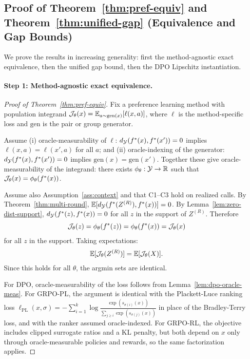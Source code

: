 \subsection{Proof of Theorem~\ref{thm:pref-equiv} and Theorem~\ref{thm:unified-gap} (Equivalence and Gap Bounds)}\label{app:proof-equivalence}

We prove the results in increasing generality: first the method-agnostic exact equivalence, then the unified gap bound, then the DPO Lipschitz instantiation.

\paragraph{Step 1: Method-agnostic exact equivalence.}

\begin{proof}[Proof of Theorem~\ref{thm:pref-equiv}]
Fix a preference learning method with population integrand $\mathcal{J}_\theta(x) = \mathbb{E}_{a \sim \mathrm{gen}(x)}[\ell(x, a)]$, where $\ell$ is the method-specific loss and $\mathrm{gen}$ is the pair or group generator.

Assume (i) oracle-measurability of $\ell$: $d_{\mathcal{Y}}(f^\ast(x), f^\ast(x')) = 0$ implies $\ell(x,a) = \ell(x',a)$ for all $a$; and (ii) oracle-indexing of the generator: $d_{\mathcal{Y}}(f^\ast(x), f^\ast(x')) = 0$ implies $\mathrm{gen}(x) = \mathrm{gen}(x')$. Together these give oracle-measurability of the integrand: there exists $\phi_\theta: \mathcal{Y} \to \mathbb{R}$ such that $\mathcal{J}_\theta(x) = \phi_\theta(f^\ast(x))$.

Assume also Assumption~\ref{ass:context} and that C1--C3 hold on realized calls. By Theorem~\ref{thm:multi-round}, $\mathbb{E}[d_{\mathcal{Y}}(f^\ast(Z^{(R)}), f^\ast(x))] = 0$. By Lemma~\ref{lem:zero-dist-support}, $d_{\mathcal{Y}}(f^\ast(z), f^\ast(x)) = 0$ for all $z$ in the support of $Z^{(R)}$. Therefore
\[
\mathcal{J}_\theta(z) = \phi_\theta(f^\ast(z)) = \phi_\theta(f^\ast(x)) = \mathcal{J}_\theta(x)
\]
for all $z$ in the support. Taking expectations:
\[
\mathbb{E}[\mathcal{J}_\theta(Z^{(R)})] = \mathbb{E}[\mathcal{J}_\theta(X)].
\]
Since this holds for all $\theta$, the argmin sets are identical.

For DPO, oracle-measurability of the loss follows from Lemma~\ref{lem:dpo-oracle-meas}. For GRPO-PL, the argument is identical with the Plackett-Luce ranking loss $\ell_{\mathrm{PL}}(x, \sigma) = -\sum_{i=1}^k \log \frac{\exp(s_{\sigma(i)}(x))}{\sum_{j \ge i} \exp(s_{\sigma(j)}(x))}$ in place of the Bradley-Terry loss, and with the ranker assumed oracle-indexed. For GRPO-RL, the objective includes clipped surrogate ratios and a KL penalty, but both depend on $x$ only through oracle-measurable policies and rewards, so the same factorization applies.
\end{proof}

